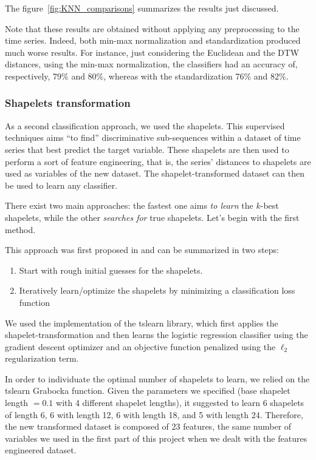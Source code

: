 \documentclass[10pt, a4paper, twocolumn]{article}
\begin{document}
The figure~\ref{fig:KNN_comparisons} summarizes the results just discussed. 

Note that these results are obtained without applying any preprocessing to the time series. Indeed, both min-max normalization and standardization produced much worse results. For instance, just considering the Euclidean and the DTW distances, using the min-max normalization, the classifiers had an accuracy of, respectively, 79\% and 80\%, whereas with the standardization 76\% and 82\%.

\subsubsection*{Shapelets transformation}

As a second classification approach, we used the shapelets. This supervised techniques aims ``to find'' discriminative sub-sequences within a dataset of time series that best predict the target variable. These shapelets are then used to perform a sort of feature engineering, that is, the series’ distances to shapelets are used as variables of the new dataset. The shapelet-transformed dataset can then be used to learn any classifier. 

There exist two main approaches: the fastest one aims \textit{to learn} the $k$-best shapelets, while the other \textit{searches for} true shapelets. Let’s begin with the first method.

This approach was first proposed in \textcite{Grabocka:2014} and can be summarized in two steps:

\begin{enumerate}
	\item Start with rough initial guesses for the shapelets.
	\item Iteratively learn/optimize the shapelets by minimizing a classification loss function	
\end{enumerate}

We used the implementation of the tslearn library, which first applies the shapelet-transformation and then learns the logistic regression classifier using the gradient descent optimizer and an objective function penalized using the $\ell_2$ regularization term.

In order to individuate the optimal number of shapelets to learn, we relied on the tslearn Grabocka function. Given the parameters we specified (base shapelet length $=0.1$ with 4 different shapelet lengths), it suggested to learn 6 shapelets of length 6, 6 with length 12, 6 with length 18, and 5 with length 24.  Therefore, the new transformed dataset is composed of 23 features, the same number of variables we used in the first part of this project when we dealt with the features engineered dataset.
\end{document}
